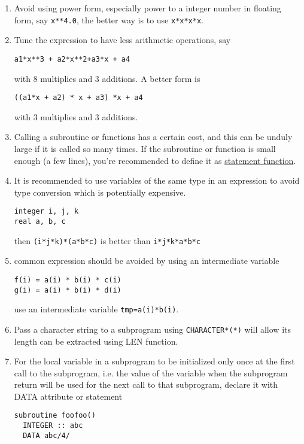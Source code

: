 \begin{enumerate}
\item Avoid using power form, especially power to a integer number in
  floating form, say \verb!x**4.0!, the better way is to use
  \verb!x*x*x*x!. 
\item Tune the expression to have less arithmetic operations, say
\begin{lstlisting}
a1*x**3 + a2*x**2+a3*x + a4
\end{lstlisting}
  with 8 multiplies and 3 additions. A better form is
\begin{lstlisting}
((a1*x + a2) * x + a3) *x + a4
\end{lstlisting}
with 3 multiplies and 3 additions.

\item Calling a subroutine or functions has a certain cost, and this
  can be unduly large if it is called so many times. If the subroutine
  or function is small enough (a few lines), you're recommended to
  define it as \hyperref[sec:statement-functions]{statement function}.

\item It is recommended to use variables of the same type in an
  expression to avoid type conversion which is potentially expensive. 
\begin{lstlisting}
integer i, j, k
real a, b, c
\end{lstlisting}
then \verb!(i*j*k)*(a*b*c)! is better than \verb!i*j*k*a*b*c!

\item common expression should be avoided by using an intermediate
  variable
\begin{lstlisting}
f(i) = a(i) * b(i) * c(i)
g(i) = a(i) * b(i) * d(i)
\end{lstlisting}
use an intermediate variable \verb!tmp=a(i)*b(i)!.

\item Pass a character string to a subprogram using
  \verb!CHARACTER*(*)! will allow its length can be extracted using
  LEN function. 

\item For the local variable in a subprogram to be initialized only
  once at the first call to the subprogram, i.e. the value of the
  variable when the subprogram return will be used for the next call
  to that subprogram, declare it with DATA attribute or statement
\begin{verbatim}
subroutine foofoo()
  INTEGER :: abc
  DATA abc/4/


\end{verbatim}
\end{enumerate}
